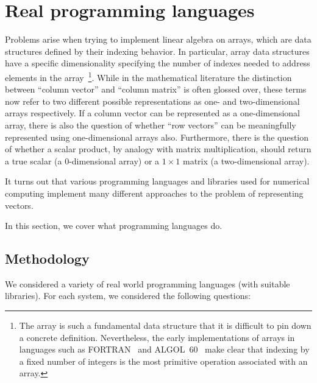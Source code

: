 \section{Real programming languages}

Problems arise when trying to implement linear algebra on arrays, which are data structures defined by their indexing behavior. In particular, array data structures have a specific dimensionality specifying the number of indexes needed to address elements in the array~\footnote{The array is such a fundamental data structure that it is difficult to pin down a concrete definition. Nevertheless, the early implementations of arrays in languages such as FORTRAN~\cite[p36]{Backus1956} and ALGOL~60~\cite[Sec. 2.3]{Randell1964} make clear that indexing by a fixed number of integers is the most primitive operation associated with an array.}. While in the mathematical literature the distinction between ``column vector'' and ``column matrix'' is often glossed over, these terms now refer to two different possible representations as one- and two-dimensional arrays respectively. If a column vector can be represented as a one-dimensional array, there is also the question of whether ``row vectors'' can be meaningfully represented using one-dimensional arrays also. Furthermore, there is the question of whether a scalar product, by analogy with matrix multiplication, should return a true scalar (a 0-dimensional array) or a $1\times1$ matrix (a two-dimensional array).

It turns out that various programming languages and libraries used for numerical computing implement many different approaches to the problem of representing vectors.

In this section, we cover what programming languages do.

\subsection{Methodology}

We considered a variety of real world programming languages (with suitable libraries).
For each system, we considered the following questions:

